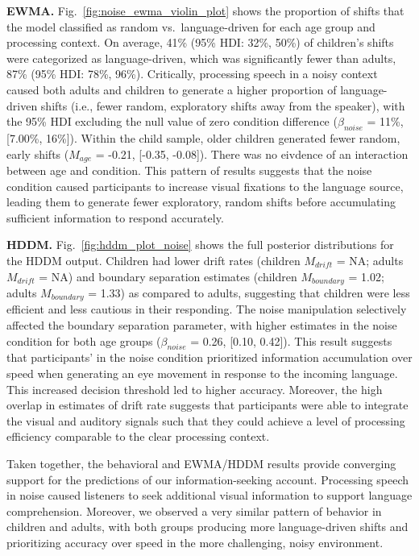 \documentclass[english,floatsintext,man]{apa6}
\begin{document}
\textbf{EWMA.} Fig.~\ref{fig:noise_ewma_violin_plot} shows the
proportion of shifts that the model classified as random
vs.~language-driven for each age group and processing context. On
average, 41\% (95\% HDI: 32\%, 50\%) of children's shifts were
categorized as language-driven, which was significantly fewer than
adults, 87\% (95\% HDI: 78\%, 96\%). Critically, processing speech in a
noisy context caused both adults and children to generate a higher
proportion of language-driven shifts (i.e., fewer random, exploratory
shifts away from the speaker), with the 95\% HDI excluding the null
value of zero condition difference (\(\beta_{noise}\) = 11\%, {[}7.00\%,
16\%{]}). Within the child sample, older children generated fewer
random, early shifts (\(M_{age}\) = -0.21, {[}-0.35, -0.08{]}). There
was no eivdence of an interaction between age and condition. This
pattern of results suggests that the noise condition caused participants
to increase visual fixations to the language source, leading them to
generate fewer exploratory, random shifts before accumulating sufficient
information to respond accurately.

\textbf{HDDM.} Fig.~\ref{fig:hddm_plot_noise} shows the full posterior
distributions for the HDDM output. Children had lower drift rates
(children \(M_{drift}\) = NA; adults \(M_{drift}\) = NA) and boundary
separation estimates (children \(M_{boundary}\) = 1.02; adults
\(M_{boundary}\) = 1.33) as compared to adults, suggesting that children
were less efficient and less cautious in their responding. The noise
manipulation selectively affected the boundary separation parameter,
with higher estimates in the noise condition for both age groups
(\(\beta_{noise}\) = 0.26, {[}0.10, 0.42{]}). This result suggests that
participants' in the noise condition prioritized information
accumulation over speed when generating an eye movement in response to
the incoming language. This increased decision threshold led to higher
accuracy. Moreover, the high overlap in estimates of drift rate suggests
that participants were able to integrate the visual and auditory signals
such that they could achieve a level of processing efficiency comparable
to the clear processing context.

Taken together, the behavioral and EWMA/HDDM results provide converging
support for the predictions of our information-seeking account.
Processing speech in noise caused listeners to seek additional visual
information to support language comprehension. Moreover, we observed a
very similar pattern of behavior in children and adults, with both
groups producing more language-driven shifts and prioritizing accuracy
over speed in the more challenging, noisy environment.
\end{document}
